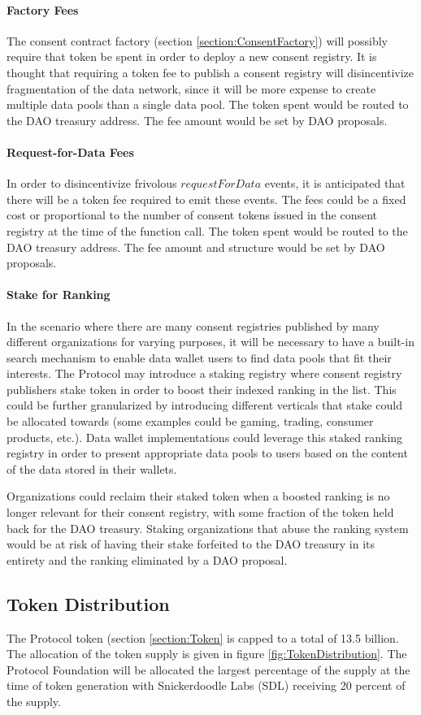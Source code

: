 \paragraph{Factory Fees}
The consent contract factory (section \ref{section:ConsentFactory}) will possibly require that token be spent in order to deploy a new consent registry. It is thought that requiring a token fee to publish a consent registry will disincentivize fragmentation of the data network, since it will be more expense to create multiple data pools than a single data pool. The token spent would be routed to the DAO treasury address. The fee amount would be set by DAO proposals. 

\paragraph{Request-for-Data Fees}
In order to disincentivize frivolous $requestForData$ events, it is anticipated that there will be a token fee
required to emit these events. The fees could be a fixed cost or proportional to the number of consent tokens
issued in the consent registry at the time of the function call. The token spent would be routed to the DAO treasury address. The fee amount and structure would be set by DAO proposals. 

\paragraph{Stake for Ranking}

In the scenario where there are many consent registries published by many different organizations for varying purposes, it will be necessary to have a built-in search mechanism to enable data wallet users to find data pools that fit their interests. The Protocol may introduce a staking registry where consent registry
publishers stake token in order to boost their indexed ranking in the list. This could be further granularized by introducing different verticals that stake could be allocated towards (some examples could be gaming, trading, consumer products, etc.). Data wallet implementations could leverage this staked ranking registry in order to present appropriate data pools to users based on the content of the data stored in their wallets. 

Organizations could reclaim their staked token when a boosted ranking is no longer relevant for their consent registry, with some fraction of the token held back for the DAO treasury. Staking organizations that abuse the ranking system would be at risk of having their stake forfeited to the DAO treasury in its entirety and the ranking eliminated by a DAO proposal. 

\subsection{Token Distribution}

The Protocol token (section \ref{section:Token} is capped to a total of 13.5 billion. The allocation of the token supply is given in figure \ref{fig:TokenDistribution}. The Protocol Foundation will be allocated the largest percentage of the supply at the time of token generation with Snickerdoodle Labs (SDL) receiving 20 percent of the supply.